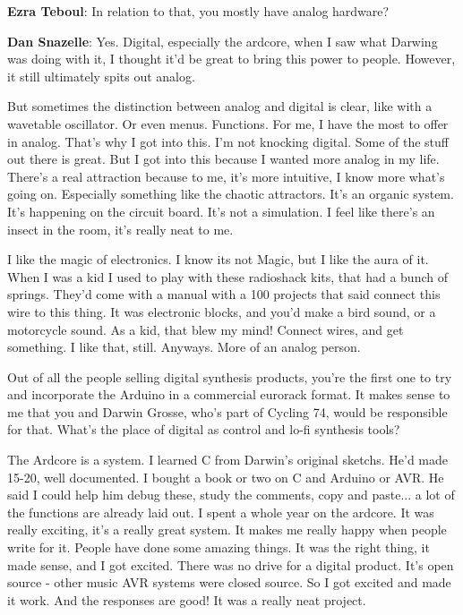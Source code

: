 \textbf{Ezra Teboul}: In relation to that, you mostly have analog hardware?

\textbf{Dan Snazelle}: Yes. Digital, especially the ardcore, when I saw what Darwing was doing with it, I thought it'd be great to bring this power to people. However, it still ultimately spits out analog. 

But sometimes the distinction between analog and digital is clear, like with a wavetable oscillator. Or even menus. Functions. For me, I have the most to offer in analog. That's why I got into this. I'm not knocking digital. Some of the stuff out there is great. But I got into this because I wanted more analog in my life. There's a real attraction because to me, it's more intuitive, I know more what's going on. Especially something like the chaotic attractors. It's an organic system. It's happening on the circuit board. It's not a simulation. I feel like there's an insect in the room, it's really neat to me. 

I like the magic of electronics. I know its not Magic, but I like the aura of it. When I was a kid I used to play with these radioshack kits, that had a bunch of springs. They'd come with a manual with a 100 projects that said connect this wire to this thing. It was electronic blocks, and you'd make a bird sound, or a motorcycle sound. As a kid, that blew my mind! Connect wires, and get something. I like that, still. Anyways. More of an analog person. 

Out of all the people selling digital synthesis products, you're the first one to try and incorporate the Arduino in a commercial eurorack format. It makes sense to me that you and Darwin Grosse, who's part of Cycling 74, would be responsible for that. What's the place of digital as control and lo-fi synthesis tools? 

The Ardcore is a system. I learned C from Darwin's original sketchs. He'd made 15-20, well documented. I bought a book or two on C and Arduino or AVR. He said I could help him debug these, study the comments, copy and paste... a lot of the functions are already laid out. I spent a whole year on the ardcore. It was really exciting, it's a really great system. It makes me really happy when people write for it. People have done some amazing things. It was the right thing, it made sense, and I got excited. There was no drive for a digital product. It's open source - other music AVR systems were closed source. So I got excited and made it work. And the responses are good! It was a really neat project. 

